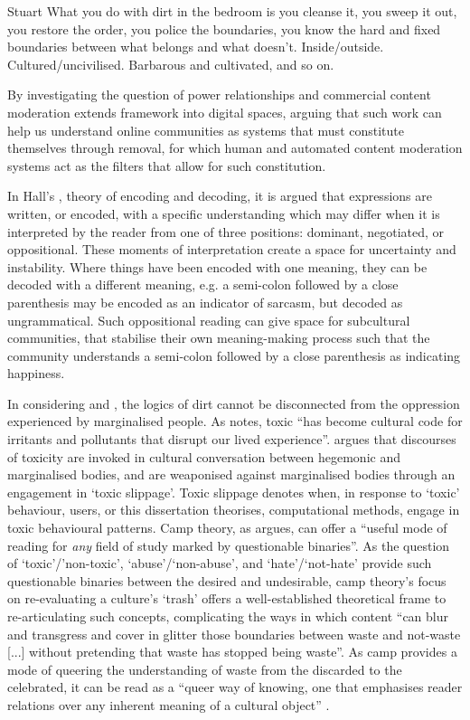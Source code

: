 \begin{citequote}{Stuart \citet[p.3]{Hall:1997}}
  What you do with dirt in the bedroom is you cleanse it, you sweep it out, you restore the order, you police the boundaries, you know the hard and fixed boundaries between what belongs and what doesn't. Inside/outside. Cultured/uncivilised. Barbarous and cultivated, and so on.
\end{citequote}

By investigating the question of power relationships and commercial content moderation \citet{Lepawsky:2019} extends \citet{Douglas:1966} framework into digital spaces, arguing that such work can help us understand online communities as systems that must constitute themselves through removal, for which human and automated content moderation systems act as the filters that allow for such constitution.

In Hall's \citeyearpar{Hall:1997}, theory of encoding and decoding, it is argued that expressions are written, or encoded, with a specific understanding which may differ when it is interpreted by the reader from one of three positions: dominant, negotiated, or oppositional.
These moments of interpretation create a space for uncertainty and instability.
Where things have been encoded with one meaning, they can be decoded with a different meaning, e.g.
a semi-colon followed by a close parenthesis may be encoded as an indicator of sarcasm, but decoded as ungrammatical.
Such oppositional reading can give space for subcultural communities, that stabilise their own meaning-making process such that the community understands a semi-colon followed by a close parenthesis as indicating happiness.

In considering \citet{Hall:1997} and \citet{Lepawsky:2019}, the logics of dirt cannot be disconnected from the oppression experienced by marginalised people.
As \citet{Risam:2015} notes, toxic ``has become cultural code for irritants and pollutants that disrupt our lived experience''.
\citet{Risam:2015} argues that discourses of toxicity are invoked in cultural conversation between hegemonic and marginalised bodies, and are weaponised against marginalised bodies through an engagement in `toxic slippage'.
Toxic slippage denotes when, in response to `toxic' behaviour, users, or this dissertation theorises, computational methods, engage in toxic behavioural patterns.
Camp theory, as \citet{Schaffer:2015} argues, can offer a ``useful mode of reading for \textit{any} field of study marked by questionable binaries''.
As the question of `toxic'/'non-toxic', `abuse'/`non-abuse', and `hate'/`not-hate' provide such questionable binaries between the desired and undesirable, camp theory's focus on re-evaluating a culture's `trash' offers a well-established theoretical frame to re-articulating such concepts, complicating the ways in which content ``can blur and transgress and cover in glitter those boundaries between waste and not-waste [...] without pretending that waste has stopped being waste''\citep{Schaffer:2015}.
As camp provides a mode of queering the understanding of waste from the discarded to the celebrated, it can be read as a ``queer way of knowing, one that emphasises reader relations over any inherent meaning of a cultural object'' \citep{Schaffer:2015}.

